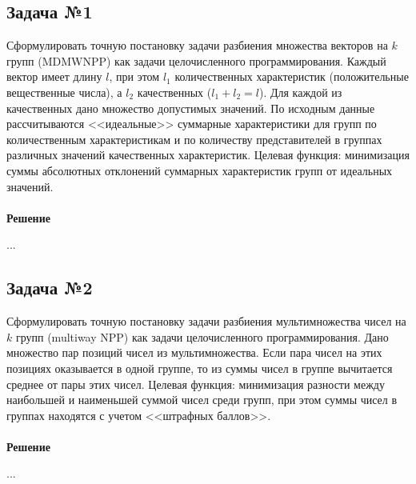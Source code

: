 \documentclass[14pt,fleqn]{extarticle}
\begin{document}
    \subsection*{Задача №1}
	Сформулировать точную постановку задачи разбиения множества векторов на $k$ групп (MDMWNPP) как задачи целочисленного программирования. Каждый вектор имеет длину $l$, при этом $l_1$ количественных характеристик (положительные вещественные числа), а $l_2$ качественных ($l_1 + l_2 = l$). Для каждой из качественных дано множество допустимых значений. По исходным данные рассчитываются <<идеальные>> суммарные характеристики для групп по количественным характеристикам и по количеству представителей в группах различных значений качественных характеристик. Целевая функция: минимизация суммы абсолютных отклонений суммарных характеристик групп от идеальных значений.\\\\
	
	\textbf{Решение}
	
	...
	
	\newpage
    \subsection*{Задача №2}
    Сформулировать точную постановку задачи разбиения мультимножества чисел на $k$ групп (multiway NPP) как задачи целочисленного программирования. Дано множество пар позиций чисел из мультимножества. Если пара чисел на этих позициях оказывается в одной группе, то из суммы чисел в группе вычитается среднее от пары этих чисел. Целевая функция: минимизация разности между наибольшей и наименьшей суммой чисел среди групп, при этом суммы чисел в группах находятся с учетом <<штрафных баллов>>.\\\\
    
    \textbf{Решение}
    
    ...
\end{document}
